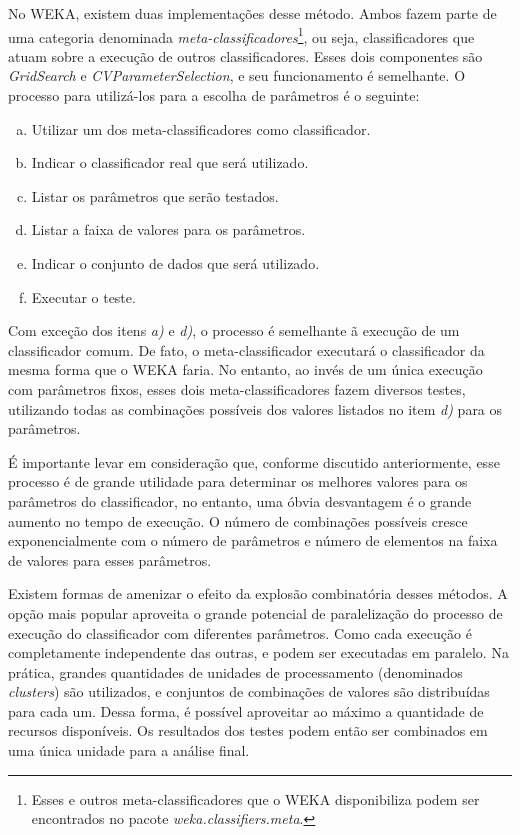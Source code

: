 No WEKA, existem duas implementações desse método. Ambos fazem parte de uma categoria denominada \emph{meta-classificadores}\footnote{Esses e outros meta-classificadores que o WEKA disponibiliza podem ser encontrados no pacote \emph{weka.classifiers.meta}.}, ou seja, classificadores que atuam sobre a execução de outros classificadores. Esses dois componentes são \emph{GridSearch} e \emph{CVParameterSelection}, e seu funcionamento é semelhante. O processo para utilizá-los para a escolha de parâmetros é o seguinte:

\begin{enumerate}[a)]
    \item Utilizar um dos meta-classificadores como classificador.
    \item Indicar o classificador real que será utilizado.
    \item Listar os parâmetros que serão testados.
    \item Listar a faixa de valores para os parâmetros.
    \item Indicar o conjunto de dados que será utilizado.
    \item Executar o teste.
\end{enumerate}

Com exceção dos itens \emph{a)} e \emph{d)}, o processo é semelhante ã execução de um classificador comum. De fato, o meta-classificador executará o classificador da mesma forma que o WEKA faria. No entanto, ao invés de um única execução com parâmetros fixos, esses dois meta-classificadores fazem diversos testes, utilizando todas as combinações possíveis dos valores listados no item \emph{d)} para os parâmetros.

É importante levar em consideração que, conforme discutido anteriormente, esse processo é de grande utilidade para determinar os melhores valores para os parâmetros do classificador, no entanto, uma óbvia desvantagem é o grande aumento no tempo de execução. O número de combinações possíveis cresce exponencialmente com o número de parâmetros e número de elementos na faixa de valores para esses parâmetros.

Existem formas de amenizar o efeito da explosão combinatória desses métodos. A opção mais popular aproveita o grande potencial de paralelização do processo de execução do classificador com diferentes parâmetros. Como cada execução é completamente independente das outras, e podem ser executadas em paralelo. Na prática, grandes quantidades de unidades de processamento (denominados \emph{clusters}) são utilizados, e conjuntos de combinações de valores são distribuídas para cada um. Dessa forma, é possível aproveitar ao máximo a quantidade de recursos disponíveis. Os resultados dos testes podem então ser combinados em uma única unidade para a análise final.

